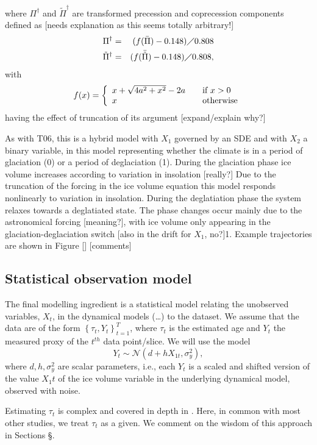 \documentclass[a4paper,12pt]{article}
\begin{document}
where $\Pi^{\dag}$ and $\tilde{\Pi}^{\dag}$ are transformed precession and coprecession components defined as [needs
explanation as this seems totally arbitrary!]
\begin{eqnarray*}
  \Pi^{\dag} & = & (f(\bar{\Pi}) - 0.148) \diagup 0.808 \\
\tilde{\Pi}^{\dag} & = & (f(\bar{\tilde{\Pi}}) - 0.148) \diagup 0.808,
\end{eqnarray*}
with
\[ f(x) = \left\{
  \begin{array}{l l}
    x + \sqrt{4a^2 + x^2} - 2a & \quad \text{if $x > 0$}\\
    x & \quad \text{otherwise}
  \end{array} \right.
\]
  having the effect of truncation of its argument [expand/explain why?]

  As with T06, this is a hybrid model with $X_1$ governed by an SDE and with $X_2$ a binary variable, in this model 
  representing whether the climate is in a period of glaciation (0) or a period of deglaciation (1).  
  During the glaciation phase ice volume increases according to variation in insolation [really?]
Due to the truncation of the forcing in the ice volume equation this model responds nonlinearly to variation in insolation.
During the deglatiation phase the system relaxes towards a deglatiated state.
The phase changes occur mainly due to the astronomical forcing [meaning?], with ice volume only appearing in the 
glaciation-deglaciation switch [also in the drift for $X_1$, no?]1.
  Example
  trajectories are shown in Figure [] [comments]



\subsection{Statistical observation model}

The final modelling ingredient is a statistical model relating the unobserved 
variables, $X_t$, in the dynamical models
(\dots) to the  dataset.  We assume that the data are of the form $\left\{ \tau_t, Y_t\right\}_{t=1}^T$, where $\tau_t$ is the estimated age and $Y_t$ the measured proxy of the $t^{th}$ data point/slice. 
We will use the model
\[ Y_t \sim \mathcal{N} ( d + h X_{1t}, \sigma_y^2), \]
where $d,h,\sigma_y^2$ are scalar parameters, i.e., each $Y_t$ is a scaled and shifted
version of the value $X_1t$ of the ice volume variable in the underlying dynamical model,
observed with noise.

Estimating $\tau_t$ is complex and covered in depth in \cite{???}. Here, in common with most other studies, we treat $\tau_t$ as a given. We comment on the wisdom of this approach in Sections \S.
\end{document}
